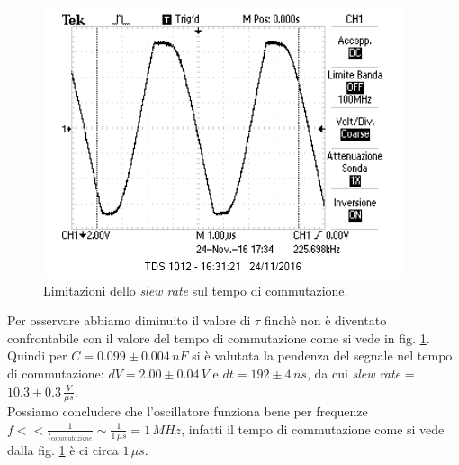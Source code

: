 \documentclass[10pt,a4paper]{article}
\begin{document}
\begin{figure}[htb!]
\centering
\includegraphics[scale=1.0]{immagini/multivibSlewRate.png}
\caption{Limitazioni dello \emph{slew rate} sul tempo di commutazione.}
\label{slewrate}
\end{figure}

Per osservare abbiamo diminuito il valore di $\tau$ finchè non è diventato confrontabile con il valore del tempo di commutazione come si vede in fig. \ref{slewrate}. Quindi per $C = 0.099 \pm 0.004\, nF$ si è valutata la pendenza del segnale nel tempo di commutazione: $dV = 2.00 \pm 0.04 \, V$ e $dt = 192 \pm 4 \, ns$, da cui \emph{slew rate} = $10.3 \pm 0.3 \, \frac{V}{\mu s}$.\\
Possiamo concludere che l'oscillatore funziona bene per frequenze $f << \frac{1}{t_{commutazione}} \sim \frac{1}{1 \, \mu s} = 1 \, MHz$, infatti il tempo di commutazione come si vede dalla fig. \ref{slewrate} è ci circa $1 \, \mu s$.
\end{document}
